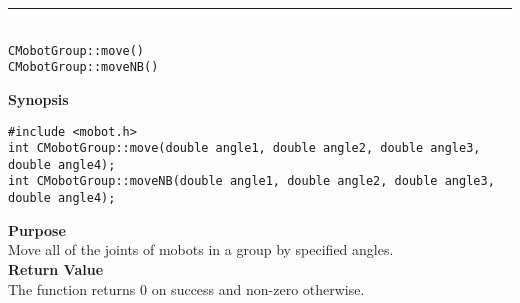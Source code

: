 \noindent
\vspace{5pt}
\rule{4.5in}{0.015in}\\
\noindent
{\LARGE \texttt{CMobotGroup::move()}}\\
{\LARGE \texttt{CMobotGroup::moveNB()}}\\
{}

\noindent
{\bf Synopsis}
\vspace{-8pt}
\begin{verbatim}
#include <mobot.h>
int CMobotGroup::move(double angle1, double angle2, double angle3, double angle4);
int CMobotGroup::moveNB(double angle1, double angle2, double angle3, double angle4);
\end{verbatim}

\noindent
{\bf Purpose}\\
Move all of the joints of mobots in a group by specified angles.\\

\noindent
{\bf Return Value}\\
The function returns 0 on success and non-zero otherwise.\\

